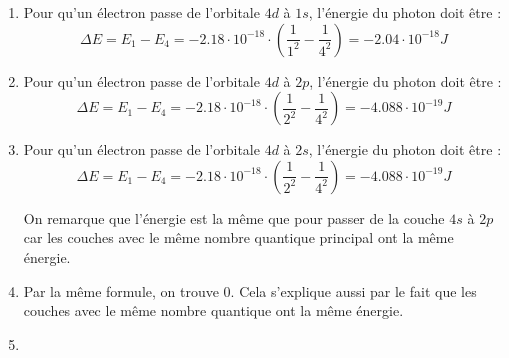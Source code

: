 \documentclass{article}
\begin{document}
\begin{enumerate}
	\item Pour qu'un électron passe de l'orbitale $4d$ à $1s$, l'énergie du photon doit être :
				$$\Delta E = E_1 - E_4 = -2.18 \cdot 10^{-18} \cdot (\frac{1}{1^2} - \frac{1}{4^2}) = -2.04 
				\cdot 10^{-18} J$$
	\item	Pour qu'un électron passe de l'orbitale $4d$ à $2p$, l'énergie du photon doit être :
				$$\Delta E = E_1 - E_4 = -2.18 \cdot 10^{-18} \cdot (\frac{1}{2^2} - \frac{1}{4^2}) = -4.088 
				\cdot 10^{-19} J$$
	\item Pour qu'un électron passe de l'orbitale $4d$ à $2s$, l'énergie du photon doit être :
				$$\Delta E = E_1 - E_4 = -2.18 \cdot 10^{-18} \cdot (\frac{1}{2^2} - \frac{1}{4^2}) = -4.088 
				\cdot 10^{-19} J$$
				
				On remarque que l'énergie est la même que pour passer de la couche $4s$ à $2p$ car les couches
				avec le même nombre quantique principal ont la même énergie.
	\item	Par la même formule, on trouve 0. Cela s'explique aussi par le fait que les couches avec le même 
				nombre quantique ont la même énergie.
	\item %
\end{enumerate}
\end{document}
